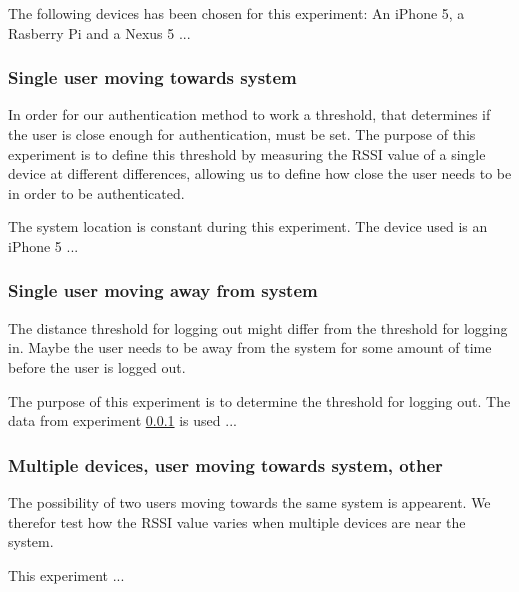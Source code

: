 The following devices has been chosen for this experiment: An iPhone 5, a Rasberry Pi and a Nexus 5 ... 

\subsubsection{Single user moving towards system}
\label{section:MovingTowardsSystem}
In order for our authentication method to work a threshold, that determines if the user is close enough for authentication, must be set. The purpose of this experiment is to define this threshold by measuring the RSSI value of a single device at different differences, allowing us to define how close the user needs to be in order to be authenticated. 

The system location is constant during this experiment. The device used is an iPhone 5 ...

\subsubsection{Single user moving away from system}
The distance threshold for logging out might differ from the threshold for logging in. Maybe the user needs to be away from the system for some amount of time before the user is logged out. 

The purpose of this experiment is to determine the threshold for logging out. The data from experiment \ref{section:MovingTowardsSystem} is used ...


\subsubsection{Multiple devices, user moving towards system, other}
The possibility of two users moving towards the same system is appearent. We therefor test how the RSSI value varies when multiple devices are near the system.

This experiment ...

